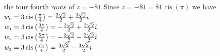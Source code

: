 { the four fourth roots of $z=-81$}
{ Since $z=-81 = 81\operatorname{cis}\left(\pi \right)$ we have \\$w_{\text{\tiny$0$}} =3\operatorname{cis}\left(\frac{\pi}{4}\right) = \frac{3\sqrt{2}}{2} + \frac{3\sqrt{2}}{2}i$\\$w_{\text{\tiny$1$}} = 3\operatorname{cis}\left(\frac{3\pi}{4}\right) =-\frac{3\sqrt{2}}{2} + \frac{3\sqrt{2}}{2}i$\\$w_{\text{\tiny$2$}} = 3\operatorname{cis}\left(\frac{5\pi}{4}\right) =-\frac{3\sqrt{2}}{2} - \frac{3\sqrt{2}}{2}i$\\$w_{\text{\tiny$3$}} = 3\operatorname{cis}\left(\frac{7\pi}{4}\right) =\frac{3\sqrt{2}}{2} - \frac{3\sqrt{2}}{2}i$}
